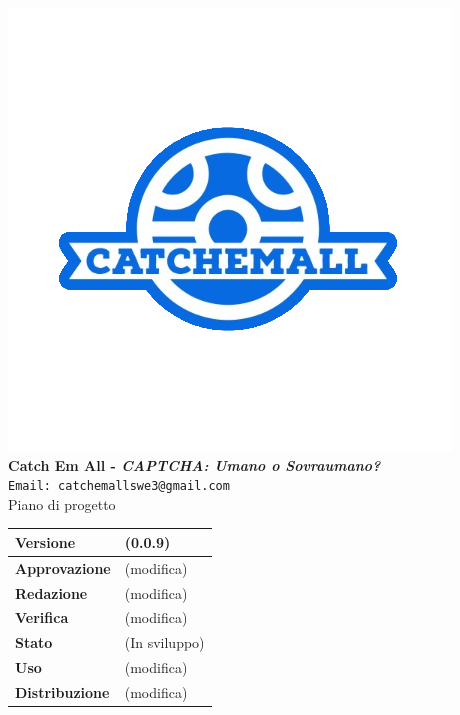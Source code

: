 \begin{titlepage}
\begin{center}
	\includegraphics[scale = 1.5]{img/logo.png}\\
	\bigskip
	\large \textbf{Catch Em All - \textit{CAPTCHA: Umano o Sovraumano?}}\\
	\texttt{Email: catchemallswe3@gmail.com}\\
	\vfill
	{\fontsize{1.5cm}{0}\selectfont Piano di progetto}\\
	\vfill
		\centering
		\setlength\extrarowheight{4pt}
		\begin{tabular}{| m{4.5cm} | m{4.5cm} |}
			\hline
			\textbf{Versione} & (0.0.9)\\
			\hline
			\textbf{Approvazione} & (modifica)\\
			\hline
			\textbf{Redazione} & (modifica)\\
			\hline
			\textbf{Verifica} & (modifica)\\
			\hline
			\textbf{Stato} & (In sviluppo)\\
			\hline
			\textbf{Uso} & (modifica)\\
			\hline
			\textbf{Distribuzione} & (modifica)\\
			\hline
		\end{tabular}\\
\end{center}
\end{titlepage}
